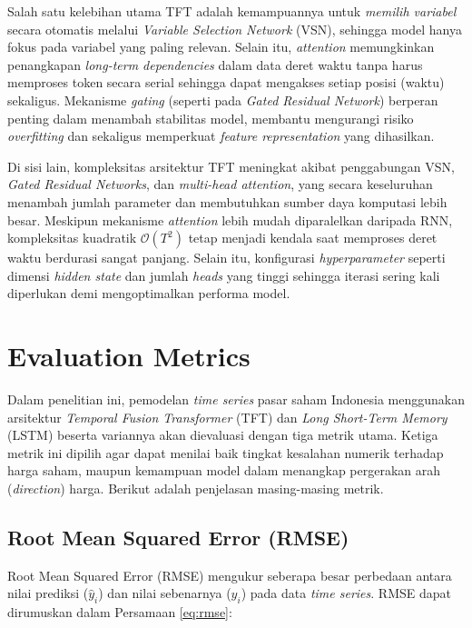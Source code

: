Salah satu kelebihan utama TFT adalah kemampuannya untuk \textit{memilih variabel} secara otomatis melalui \textit{Variable Selection Network} (VSN), sehingga model hanya fokus pada variabel yang paling relevan. Selain itu, \textit{attention} memungkinkan penangkapan \textit{long-term dependencies} dalam data deret waktu tanpa harus memproses token secara serial  sehingga dapat mengakses setiap posisi (waktu) sekaligus. Mekanisme \textit{gating} (seperti pada \textit{Gated Residual Network}) berperan penting dalam menambah stabilitas model, membantu mengurangi risiko \textit{overfitting} dan sekaligus memperkuat \textit{feature representation} yang dihasilkan.

Di sisi lain, kompleksitas arsitektur TFT meningkat akibat penggabungan VSN, \textit{Gated Residual Networks}, dan \textit{multi-head attention}, yang secara keseluruhan menambah jumlah parameter dan membutuhkan sumber daya komputasi lebih besar. Meskipun mekanisme \textit{attention} lebih mudah diparalelkan daripada RNN, kompleksitas kuadratik \(\mathcal{O}(T^2)\) tetap menjadi kendala saat memproses deret waktu berdurasi sangat panjang. Selain itu, konfigurasi \textit{hyperparameter} seperti dimensi \textit{hidden state} dan jumlah \textit{heads} yang tinggi sehingga iterasi sering kali diperlukan demi mengoptimalkan performa model. 

    
\section{Evaluation Metrics}
Dalam penelitian ini, pemodelan \textit{time series} pasar saham Indonesia menggunakan arsitektur \textit{Temporal Fusion Transformer} (TFT) dan \textit{Long Short-Term Memory} (LSTM) beserta variannya akan dievaluasi dengan tiga metrik utama. Ketiga metrik ini dipilih agar dapat menilai baik tingkat kesalahan numerik terhadap harga saham, maupun kemampuan model dalam menangkap pergerakan arah (\textit{direction}) harga. Berikut adalah penjelasan masing-masing metrik.

\subsection{Root Mean Squared Error (RMSE)}
\label{subsec:rmse}

\noindent
Root Mean Squared Error (RMSE) mengukur seberapa besar perbedaan antara nilai prediksi (\(\hat{y}_i\)) dan nilai sebenarnya (\(y_i\)) pada data \textit{time series}. RMSE dapat dirumuskan dalam Persamaan \ref{eq:rmse}:

